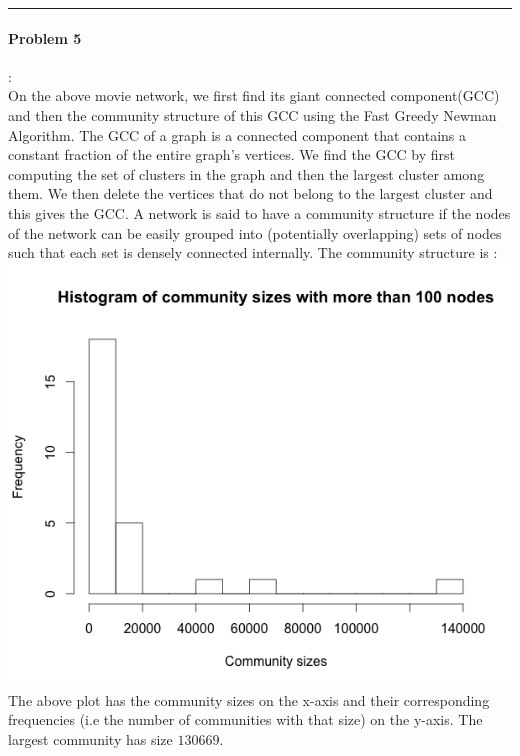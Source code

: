 \documentclass{article}
\begin{document}
\hrule

\paragraph{Problem 5}:\\
On the above movie network, we first find its giant connected component(GCC) and then the community structure of this 
GCC using the Fast Greedy Newman Algorithm. The GCC of a graph is
a connected component that contains a constant fraction of the entire graph’s
vertices. We find the GCC by first computing the set of clusters in the graph
and then the largest cluster among them. We then delete the vertices that do
not belong to the largest cluster and this gives the GCC.
A network is said to have a community structure if the nodes of the
network can be easily grouped into (potentially overlapping) sets of nodes such
that each set is densely connected internally. The community structure is :
\includegraphics[scale=0.4]{ComSize} \\
The above plot has the community sizes on the x-axis and their corresponding frequencies (i.e the number of communities
with that size) on the y-axis.
The largest community has size $130669$.\\
\end{document}
